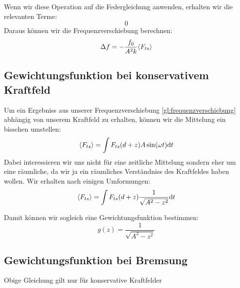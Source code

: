 Wenn wir diese Operation auf die Federgleichung anwenden, erhalten wir die relevanten Terme:
\begin{equation}
	0
\end{equation}
Daraus können wir die Frequenzverschiebung berechnen:
\begin{equation}
	\Delta f = - \frac{f_0}{A^2 k } \langle F_{ts} \rangle \label{gl:frequenzverschiebung}
\end{equation}


\subsection{Gewichtungsfunktion bei konservativem Kraftfeld}

Um ein Ergebniss aus unserer Frequenzverschiebung \ref{gl:frequenzverschiebung} abhängig von unserem Kraftfeld zu erhalten, können wir die Mittelung ein bisschen umstellen:
\begin{equation}
	\langle F_{ts} \rangle = \int F_{ts} (d + z) A \sin (\omega t) \mathrm{d}t
\end{equation}
Dabei interessieren wir uns nicht für eine zeitliche Mittelung sondern eher um eine räumliche, da wir ja ein räumliches Verständniss des Kraftfeldes haben wollen. Wir erhalten nach einigen Umformungen:
\begin{equation}
	\langle F_{ts} \rangle = \int F_{ts}(d + z) \frac{1}{\sqrt{A^2 - z^2}} \mathrm{d}t
\end{equation}

Damit können wir sogleich eine Gewichtungsfunktion bestimmen:
\begin{equation}
	g(z) = \frac{1}{\sqrt{A^2 - z^2}}
\end{equation}


\subsection{Gewichtungsfunktion bei Bremsung}
Obige Gleichung gilt nur für konservative Kraftfelder
